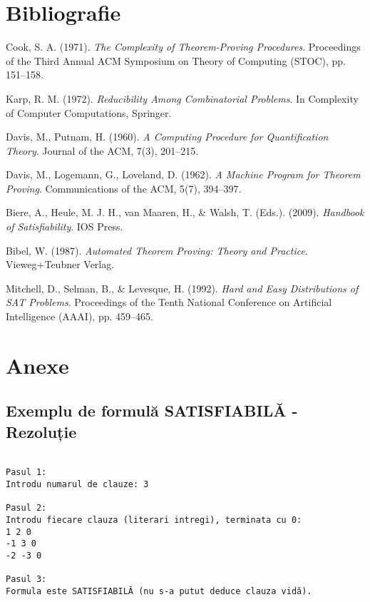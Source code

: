 \documentclass[12pt,a4paper]{article}
\begin{document}
\section{Bibliografie}
\begin{thebibliography}{9}
Cook, S. A. (1971). \textit{The Complexity of Theorem-Proving Procedures}. Proceedings of the Third Annual ACM Symposium on Theory of Computing (STOC), pp. 151–158.

Karp, R. M. (1972). \textit{Reducibility Among Combinatorial Problems}. In Complexity of Computer Computations, Springer.

Davis, M., Putnam, H. (1960). \textit{A Computing Procedure for Quantification Theory}. Journal of the ACM, 7(3), 201–215.

Davis, M., Logemann, G., Loveland, D. (1962). \textit{A Machine Program for Theorem Proving}. Communications of the ACM, 5(7), 394–397.

Biere, A., Heule, M. J. H., van Maaren, H., \& Walsh, T. (Eds.). (2009). \textit{Handbook of Satisfiability}. IOS Press.

Bibel, W. (1987). \textit{Automated Theorem Proving: Theory and Practice}. Vieweg+Teubner Verlag.

Mitchell, D., Selman, B., \& Levesque, H. (1992). \textit{Hard and Easy Distributions of SAT Problems}. Proceedings of the Tenth National Conference on Artificial Intelligence (AAAI), pp. 459–465.
\end{thebibliography}

\newpage
\appendix
\section{Anexe}

\subsection{Exemplu de formulă SATISFIABILĂ - Rezoluție}

\begin{verbatim}

Pasul 1:
Introdu numarul de clauze: 3

Pasul 2:
Introdu fiecare clauza (literari intregi), terminata cu 0:
1 2 0
-1 3 0
-2 -3 0

Pasul 3: 
Formula este SATISFIABILĂ (nu s-a putut deduce clauza vidă).
\end{verbatim}
\end{document}
